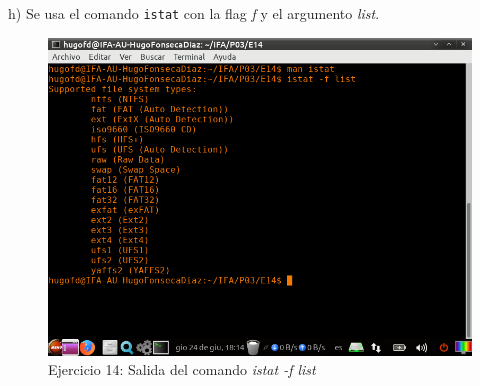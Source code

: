 \documentclass[11pt]{article}
\begin{document}
h) Se usa el comando \verb|istat| con la flag \textit{f} y el argumento \textit{list}.

\begin{figure}[H]
    \caption{Ejercicio 14: Salida del comando \textit{istat -f list}}
    \centering
    \includegraphics[scale=0.7]{e14-7.png}
\end{figure}



\begin{thebibliography}{8}
\end{thebibliography}
\end{document}

